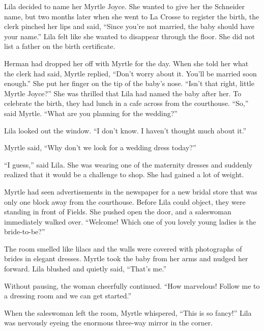 \documentclass[
  letterpaper,
]{book}
\begin{document}
Lila decided to name her Myrtle Joyce. She wanted to give her the
Schneider name, but two months later when she went to La Crosse to
register the birth, the clerk pinched her lips and said, ``Since you're
not married, the baby should have your name.'' Lila felt like she wanted
to disappear through the floor. She did not list a father on the birth
certificate.

Herman had dropped her off with Myrtle for the day. When she told her
what the clerk had said, Myrtle replied, ``Don't worry about it. You'll
be married soon enough.'' She put her finger on the tip of the baby's
nose. ``Isn't that right, little Myrtle Joyce?'' She was thrilled that
Lila had named the baby after her. To celebrate the birth, they had
lunch in a cafe across from the courthouse. ``So,'' said Myrtle. ``What
are you planning for the wedding?''

Lila looked out the window. ``I don't know. I haven't thought much about
it.''

Myrtle said, ``Why don't we look for a wedding dress today?''

``I guess,'' said Lila. She was wearing one of the maternity dresses and
suddenly realized that it would be a challenge to shop. She had gained a
lot of weight.

Myrtle had seen advertisements in the newspaper for a new bridal store
that was only one block away from the courthouse. Before Lila could
object, they were standing in front of Fields. She pushed open the door,
and a saleswoman immediately walked over. ``Welcome! Which one of you
lovely young ladies is the bride-to-be?''

The room smelled like lilacs and the walls were covered with photographs
of brides in elegant dresses. Myrtle took the baby from her arms and
nudged her forward. Lila blushed and quietly said, ``That's me.''

Without pausing, the woman cheerfully continued. ``How marvelous! Follow
me to a dressing room and we can get started.''

When the saleswoman left the room, Myrtle whispered, ``This is so
fancy!'' Lila was nervously eyeing the enormous three-way mirror in the
corner.
\end{document}

